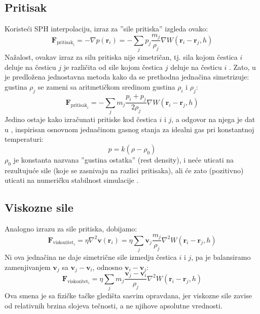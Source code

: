 \documentclass[12pt]{article}
\renewcommand{\vec}[1]{\mathbf{#1}}
\begin{document}
    \subsection{Pritisak}
        Koriste\'ci SPH interpolaciju, izraz za ''sile pritiska'' izgleda ovako:
        $$\vec{F}_{\text{pritisak}_i} = -\nabla p(\vec{r}_i)=-\sum_j p_j \frac{m_j}{\rho_j}\nabla W(\vec{r}_i-\vec{r}_j, h)$$
        Na\v zalost, ovakav izraz za silu pritiska nije simetri\v can, tj. sila kojom \v cestica $i$ deluje na \v cesticu $j$ je razli\v cita od sile kojom \v cestica $j$ deluje na \v cesticu $i$ . Zato, u \cite{Desbrun96smoothedparticles:} je predlo\v zena jednostavna metoda kako da se prethodna jedna\v cina simetrizuje: gustina $\rho_j$ se zameni sa aritmeti\v ckom sredinom gustina $\rho_i$ i $\rho_j$:
        $$\vec{F}_{\text{pritisak}_i} = -\sum_j m_j \frac{p_i+p_j}{2\rho_j}\nabla W(\vec{r}_i-\vec{r}_j, h)$$
        Jedino ostaje kako izra\v cunati pritiske kod \v cestica $i$ i $j$, a odgovor na njega je dat u \cite{Muller:2003:PFS:846276.846298}, inspirisan osnovnom jedna\v cinom gasnog stanja za idealni gas pri konstantnoj temperaturi:
        $$p = k(\rho-\rho_0)$$
        $\rho_0$ je konstanta nazvana ''gustina ostatka'' (rest density), i ne\'ce uticati na rezultuju\'ce sile (koje se zasnivaju na razlici pritisaka), ali \'ce zato (pozitivno) uticati na numeri\v cku stabilnost simulacije \cite{Muller:2003:PFS:846276.846298}.
    \subsection{Viskozne sile}
        Analogno izrazu za sile pritiska, dobijamo:
        $$\vec{F}_{\text{viskozitet}_i} = \eta\nabla^2 \vec{v}(\vec{r}_i)=\eta\sum_j \vec{v}_j \frac{m_j}{\rho_j}\nabla^2 W(\vec{r}_i-\vec{r}_j, h)$$
        Ni ova jedna\v cina ne daje simetri\v cne sile izmedju \v cestica $i$ i $j$, pa je balansiramo zamenjivanjem $\vec{v}_j$ sa $\vec{v}_j-\vec{v}_i$, odnosno $\vec{v}_i-\vec{v}_j$:
        $$\vec{F}_{\text{viskozitet}_i}=\eta\sum_j m_j \frac{\vec{v}_j-\vec{v}_i}{\rho_j}\nabla^2 W(\vec{r}_i-\vec{r}_j, h)$$
        Ova smena je sa fizi\v cke ta\v cke gledi\v sta sasvim opravdana, jer viskozne sile zavise od relativnih brzina slojeva te\v cnosti, a ne njihove apsolutne vrednosti.
\end{document}
